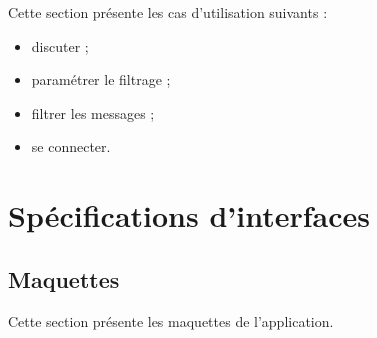 \documentclass[11pt,dvipsnames,svgnames]{report}
\begin{document}
Cette section présente les cas d'utilisation suivants :
\begin{itemize}
\item discuter ;
\item paramétrer le filtrage ;
\item filtrer les messages ;
\item se connecter.
\end{itemize}



%
%

\section{Spécifications d'interfaces}
\subsection*{Maquettes}

Cette section présente les maquettes de l'application.

%
%
%
\end{document}

